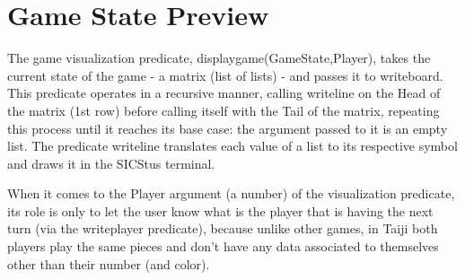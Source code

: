 \chapter{Game State Preview} \label{game-state-preview}

The game visualization predicate, display\textunderscore game(GameState,Player), takes the current state of the game - a matrix (list of lists) - and passes it to write\textunderscore board.
This predicate operates in a recursive manner, calling write\textunderscore line on the Head of the matrix (1st row) before calling itself with the Tail of the matrix, repeating this process until it reaches its base case: the argument passed to it is an empty list.
The predicate write\textunderscore line translates each value of a list to its respective symbol and draws it in the SICStus terminal.

When it comes to the Player argument (a number) of the visualization predicate, its role is only to let the user know what is the player that is having the next turn (via the write\textunderscore player predicate), because unlike other games, in Taiji both players play the same pieces and don't have any data associated to themselves other than their number (and color).

